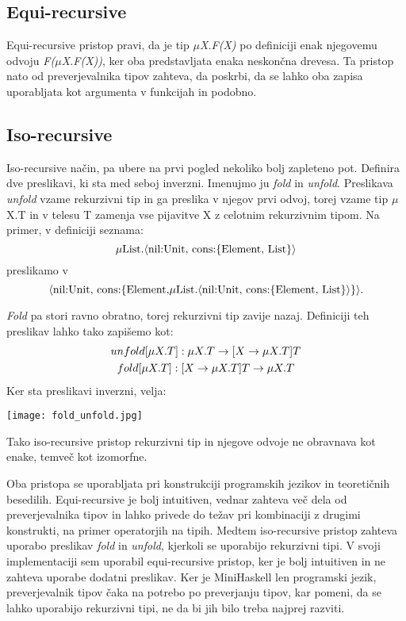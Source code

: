 \documentclass[12pt,a4paper,openany]{book}
\begin{document}
\subsection{Equi-recursive}
Equi-recursive pristop pravi, da je tip \emph{\(\mu\)X.F(X)} po definiciji enak njegovemu odvoju \emph{F(\(\mu\)X.F(X))}, ker oba predstavljata enaka neskončna drevesa. Ta pristop nato od 
preverjevalnika tipov zahteva, da poskrbi, da se lahko oba zapisa uporabljata kot argumenta v funkcijah in podobno.

\subsection{Iso-recursive}
Iso-recursive način, pa ubere na prvi pogled nekoliko bolj zapleteno pot. Definira dve preslikavi, ki sta med seboj inverzni. Imenujmo ju \emph{fold} in \emph{unfold}. Preslikava 
\emph{unfold} vzame rekurzivni tip in ga preslika v njegov prvi odvoj, torej vzame tip \(\mu\)X.T in v telesu T zamenja vse pijavitve X z celotnim rekurzivnim tipom. Na primer, v definiciji 
seznama: 
\begin{equation}
    \mu \text{List.}\langle\text{nil:Unit, cons:}\{\text{Element, List}\}\rangle \notag
\end{equation}
preslikamo v
\begin{equation}
    \langle\text{nil:Unit, cons:}\{\text{Element,} \mu \text{List.}\langle\text{nil:Unit, cons:}\{\text{Element, List}\}\rangle\}\rangle. \notag
\end{equation}
  
\emph{Fold} pa stori ravno obratno, torej rekurzivni tip zavije nazaj. Definiciji teh preslikav lahko tako zapišemo kot:
\begin{gather}
    unfold[\mu X.T]: \mu X.T \rightarrow [X \rightarrow \mu X.T] T \notag\\
    fold[\mu X.T]: [X \rightarrow \mu X.T] T \rightarrow \mu X.T \notag
\end{gather}
Ker sta preslikavi inverzni, velja:

\begin{center}
\texttt{[image: fold\_unfold.jpg]}
\end{center}

Tako iso-recursive pristop rekurzivni tip in njegove odvoje ne obravnava kot enake, temveč kot izomorfne.

Oba pristopa se uporabljata pri konstrukciji programskih jezikov in teoretičnih besedilih. Equi-recursive je bolj intuitiven, vednar zahteva več dela od preverjevalnika tipov in 
lahko privede do težav pri kombinaciji z drugimi konstrukti, na primer operatorjih na tipih. Medtem iso-recursive pristop zahteva uporabo preslikav \emph{fold} in \emph{unfold}, kjerkoli 
se uporabijo rekurzivni tipi. V svoji implementaciji sem uporabil equi-recursive pristop, ker je bolj intuitiven in ne zahteva uporabe dodatni preslikav. Ker je MiniHaskell len programski 
jezik, preverjevalnik tipov čaka na potrebo po preverjanju tipov, kar pomeni, da se lahko uporabijo rekurzivni tipi, ne da bi jih bilo treba najprej razviti.
\end{document}
